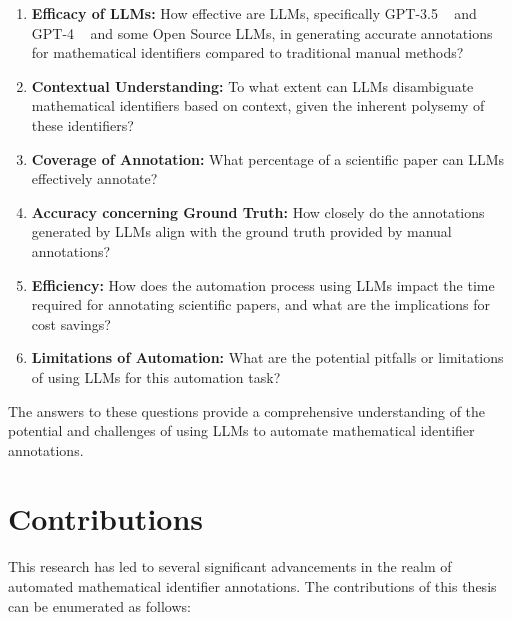 \begin{enumerate}
    \item \textbf{Efficacy of LLMs:} How effective are LLMs, specifically GPT-3.5 ~\citep{openai2023} and GPT-4 ~\citep{2303.08774} and some Open Source LLMs, in generating accurate annotations for mathematical identifiers compared to traditional manual methods?
    
    \item \textbf{Contextual Understanding:} To what extent can LLMs disambiguate mathematical identifiers based on context, given the inherent polysemy of these identifiers?
    
    \item \textbf{Coverage of Annotation:} What percentage of a scientific paper can LLMs effectively annotate?
    
    \item \textbf{Accuracy concerning Ground Truth:} How closely do the annotations generated by LLMs align with the ground truth provided by manual annotations?
    
    \item \textbf{Efficiency:} How does the automation process using LLMs impact the time required for annotating scientific papers, and what are the implications for cost savings?
    
    \item \textbf{Limitations of Automation:} What are the potential pitfalls or limitations of using LLMs for this automation task?
\end{enumerate}

The answers to these questions provide a comprehensive understanding of the potential and challenges of using LLMs to automate mathematical identifier annotations.

\section{Contributions}

This research has led to several significant advancements in the realm of automated mathematical identifier annotations. The contributions of this thesis can be enumerated as follows:

